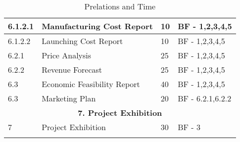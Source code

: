 \begin{longtable}{ | p{1.3cm} | p{7cm} | p{3cm} | p{3.5cm} |}
6.1.2.1 & Manufacturing Cost Report & 10 & BF - 1,2,3,4,5  \\ \hline
6.1.2.2 & Launching Cost Report  & 10 & BF - 1,2,3,4,5 \\ \hline
6.2.1 & Price Analysis & 25 & BF - 1,2,3,4,5  \\ \hline
6.2.2 & Revenue Forecast & 25 & BF - 1,2,3,4,5  \\ \hline
6.3 & Economic Feasibility Report & 40 & BF - 1,2,3,4,5 \\ \hline
6.3 & Marketing Plan & 20 & BF - 6.2.1,6.2.2 \\ \hline
\multicolumn{4}{|c|}{\textbf{7. Project Exhibition}} \\ \hline
7 & Project Exhibition &30 & BF - 3 \\ \hline
\caption{Prelations and Time} \\
\end{longtable}